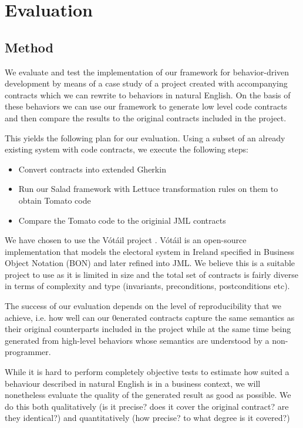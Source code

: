 \section{Evaluation}
\label{sec:Evaluation}
\subsection{Method}

We evaluate and test the implementation of our framework for behavior-driven development by means of a case study of a project created with accompanying contracts which we can rewrite to behaviors in natural English. On the basis of these behaviors we can use our framework to generate low level code contracts and then compare the results to the original contracts included in the project.
 
This yields the following plan for our evaluation. Using a subset of an already existing system with code contracts, we execute the following steps:

\begin{itemize}
	\item Convert contracts into extended Gherkin
	\item Run our Salad framework with Lettuce transformation rules on them to obtain Tomato code
	\item Compare the Tomato code to the originial JML contracts
\end{itemize}

We have chosen to use the V\'{o}t\'{a}il project \cite{votailCochranKiniry}. V\'{o}t\'{a}il is an open-source implementation that models the electoral system in Ireland specified in Business Object Notation (BON) \cite{bonmethod} and later refined into JML. We believe this is a suitable project to use as it is limited in size and the total set of contracts is fairly diverse in terms of complexity and type (invariants, preconditions, postconditions etc).

The success of our evaluation depends on the level of reproducibility that we achieve, i.e. how well can our 0enerated contracts capture the same semantics as their original counterparts included in the project while at the same time being generated from high-level behaviors whose semantics are understood by a non-programmer.
 
While it is hard to perform completely objective tests to estimate how suited a behaviour described in natural English is in a business context, we will nonetheless evaluate the quality of the generated result as good as possible. We do this both qualitatively (is it precise? does it cover the original contract? are they identical?) and quantitatively (how precise? to what degree is it covered?)
 
